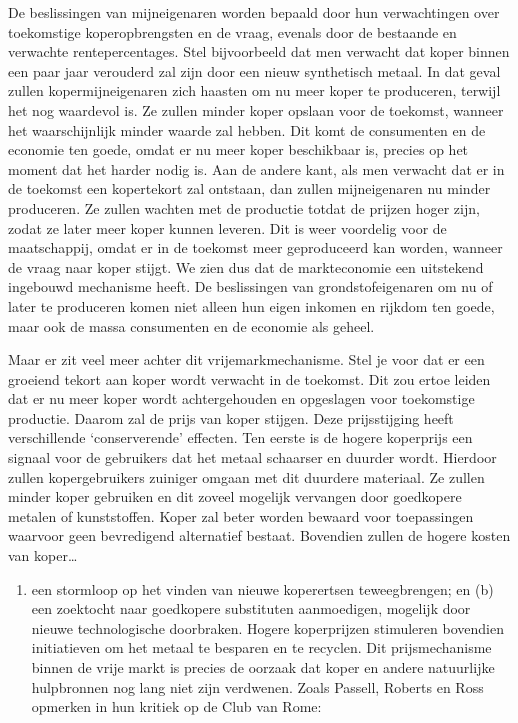 \documentclass[
  a5paper,
  smalldemyvopaper,10pt,twoside,onecolumn,openright,extrafontsizes,hidelinks]{memoir}
\providecommand{\tightlist}{%
  \setlength{\itemsep}{0pt}\setlength{\parskip}{0pt}}\usepackage{longtable,booktabs,array}
\begin{document}
De beslissingen van mijneigenaren worden bepaald door hun verwachtingen
over toekomstige koperopbrengsten en de vraag, evenals door de bestaande
en verwachte rentepercentages. Stel bijvoorbeeld dat men verwacht dat
koper binnen een paar jaar verouderd zal zijn door een nieuw synthetisch
metaal. In dat geval zullen kopermijneigenaren zich haasten om nu meer
koper te produceren, terwijl het nog waardevol is. Ze zullen minder
koper opslaan voor de toekomst, wanneer het waarschijnlijk minder waarde
zal hebben. Dit komt de consumenten en de economie ten goede, omdat er
nu meer koper beschikbaar is, precies op het moment dat het harder nodig
is. Aan de andere kant, als men verwacht dat er in de toekomst een
kopertekort zal ontstaan, dan zullen mijneigenaren nu minder produceren.
Ze zullen wachten met de productie totdat de prijzen hoger zijn, zodat
ze later meer koper kunnen leveren. Dit is weer voordelig voor de
maatschappij, omdat er in de toekomst meer geproduceerd kan worden,
wanneer de vraag naar koper stijgt. We zien dus dat de markteconomie een
uitstekend ingebouwd mechanisme heeft. De beslissingen van
grondstofeigenaren om nu of later te produceren komen niet alleen hun
eigen inkomen en rijkdom ten goede, maar ook de massa consumenten en de
economie als geheel.

Maar er zit veel meer achter dit vrijemarkmechanisme. Stel je voor dat
er een groeiend tekort aan koper wordt verwacht in de toekomst. Dit zou
ertoe leiden dat er nu meer koper wordt achtergehouden en opgeslagen
voor toekomstige productie. Daarom zal de prijs van koper stijgen. Deze
prijsstijging heeft verschillende `conserverende' effecten. Ten eerste
is de hogere koperprijs een signaal voor de gebruikers dat het metaal
schaarser en duurder wordt. Hierdoor zullen kopergebruikers zuiniger
omgaan met dit duurdere materiaal. Ze zullen minder koper gebruiken en
dit zoveel mogelijk vervangen door goedkopere metalen of kunststoffen.
Koper zal beter worden bewaard voor toepassingen waarvoor geen
bevredigend alternatief bestaat. Bovendien zullen de hogere kosten van
koper\ldots{}

\begin{enumerate}
\def\labelenumi{(\alph{enumi})}
\tightlist
\item
  een stormloop op het vinden van nieuwe koperertsen teweegbrengen; en
  (b) een zoektocht naar goedkopere substituten aanmoedigen, mogelijk
  door nieuwe technologische doorbraken. Hogere koperprijzen stimuleren
  bovendien initiatieven om het metaal te besparen en te recyclen. Dit
  prijsmechanisme binnen de vrije markt is precies de oorzaak dat koper
  en andere natuurlijke hulpbronnen nog lang niet zijn verdwenen. Zoals
  Passell, Roberts en Ross opmerken in hun kritiek op de Club van Rome:
\end{enumerate}
\end{document}
